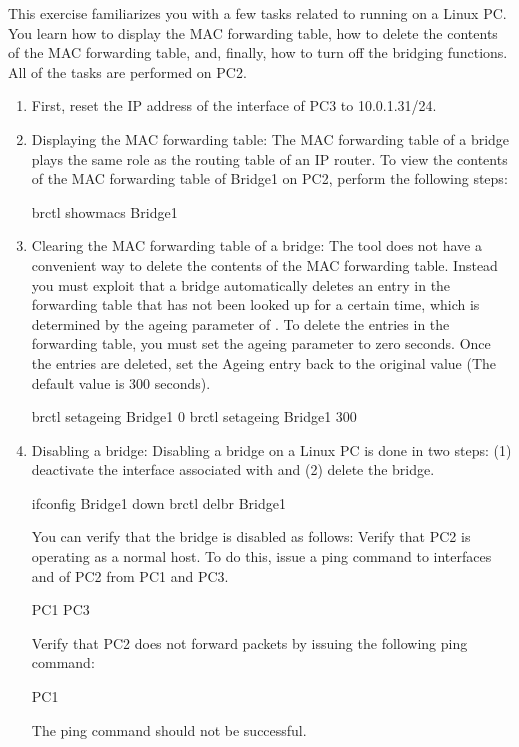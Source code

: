 This exercise familiarizes you with a few tasks related to running  on a Linux PC. You learn how to display the MAC forwarding table, how to delete the contents of the MAC forwarding table, and, finally, how to turn off the bridging functions. All of the tasks are performed on PC2.
\begin{enumerate}
	\item First, reset the IP address of the  interface of PC3 to 10.0.1.31/24.
	\item Displaying the MAC forwarding table: The MAC forwarding table of a bridge plays the same role as the routing table of an IP router. To view the contents of the MAC forwarding table of Bridge1 on PC2, perform the following steps:
		\begin{cmdblock}
	brctl showmacs Bridge1
		\end{cmdblock}
	\item Clearing the MAC forwarding table of a bridge: The  tool does not have a convenient way to delete the contents of the MAC forwarding table. Instead you must exploit that a bridge automatically deletes an entry in the forwarding table that has not been looked up for a certain time, which is determined by the ageing parameter of . To delete the entries in the forwarding table, you must set the ageing parameter to zero seconds. Once the entries are deleted, set the Ageing entry back to the original value (The default value is 300 seconds).
		\begin{cmdblock}
	brctl setageing Bridge1 0
	brctl setageing Bridge1 300
		\end{cmdblock}
	\item Disabling a bridge: Disabling a bridge on a Linux PC is done in two steps: (1) deactivate the interface associated with  and (2) delete the bridge.
		\begin{cmdblock}
	ifconfig Bridge1 down
	brctl delbr Bridge1
		\end{cmdblock}
		You can verify that the bridge is disabled as follows: Verify that PC2 is operating as a normal host. To do this, issue a ping command to interfaces  and  of PC2 from PC1 and PC3.
		\begin{cmdblock}
	PC1%
	PC3%
		\end{cmdblock}
		Verify that PC2 does not forward packets by issuing the following ping command:
		\begin{cmdblock}
	PC1%
		\end{cmdblock}
		The ping command should not be successful.
\end{enumerate}


